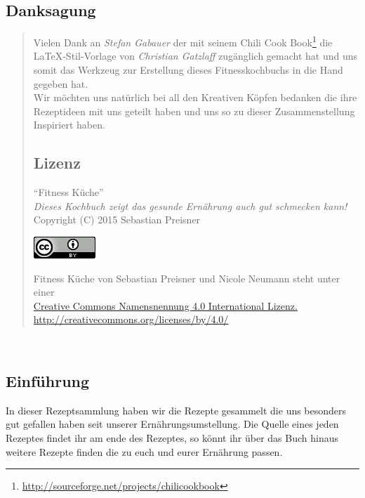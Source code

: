 \documentclass[a4paper]{scrartcl}
\begin{document}
\subsection*{\centering Danksagung}
\begin{quote}
Vielen Dank an \emph{Stefan Gabauer} der mit seinem Chili Cook Book\footnote{\url{http://sourceforge.net/projects/chilicookbook}} die \LaTeX-Stil-Vorlage von \emph{Christian Gatzlaff} zugänglich gemacht hat und uns somit das Werkzeug zur Erstellung dieses Fitnesskochbuchs in die Hand gegeben hat.\\

Wir möchten uns natürlich bei all den Kreativen Köpfen bedanken die ihre Rezeptideen mit uns geteilt haben und uns so zu dieser Zusammenstellung Inspiriert haben.
\vspace{2cm}

\subsection*{\centering Lizenz}
\begin{center}
"`Fitness Küche"'\\
\textit{Dieses Kochbuch zeigt das gesunde Ernährung auch gut schmecken kann!}\\
Copyright (C) 2015 Sebastian Preisner\\

\begin{center}
	\href{http://creativecommons.org/licenses/by-nc-sa/3.0/de/}{\includegraphics{cclogo.png}}
\end{center}

Fitness Küche von Sebastian Preisner und Nicole Neumann steht unter einer\\ \href{http://creativecommons.org/licenses/by/4.0/}{Creative Commons Namensnennung 4.0 International Lizenz.}\\
\url{http://creativecommons.org/licenses/by/4.0/}
\end{center}
\end{quote}

\newpage~
\subsection*{Einführung}
In dieser Rezeptsammlung haben wir die Rezepte gesammelt die uns besonders gut gefallen haben seit unserer Ernährungsumstellung. Die Quelle eines jeden Rezeptes findet ihr am ende des Rezeptes, so könnt ihr über das Buch hinaus weitere Rezepte finden die zu euch und eurer Ernährung passen.
\end{document}
